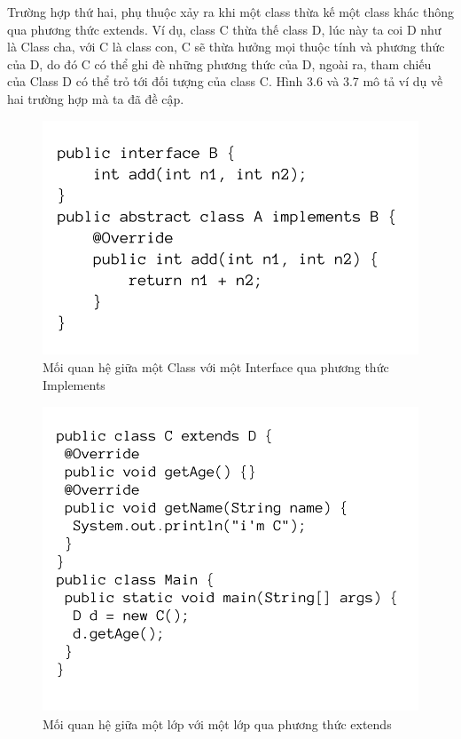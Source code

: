 \documentclass[12pt]{report}
\begin{document}
\noindent Trường hợp thứ hai, phụ thuộc xảy ra khi một class thừa kế một class khác thông qua phương thức extends. Ví dụ, class C thừa thế class D, lúc này ta coi D như là Class cha, với C là class con, C sẽ thừa hưởng mọi thuộc tính và phương thức của  D, do đó C có thể ghi đè những phương thức của D, ngoài ra, tham chiếu của Class D có thể trỏ tới đối tượng của class C. Hình 3.6 và 3.7 mô tả ví dụ về hai trường hợp mà ta đã đề cập.
\begin{figure}[!htbp]
	\centering
	\includegraphics[scale=0.36]{images/AimplementsB}
	\caption{Mối quan hệ giữa một Class với một Interface qua phương thức Implements}
	\label{fig:A_implemets_B}
\end{figure}
\begin{figure}[!htbp]
	\centering
	\includegraphics[scale=0.36]{images/CextendD}
	\caption{Mối quan hệ giữa một lớp với một lớp qua phương thức extends}
	\label{fig:CextendD}
\end{figure}
\end{document}
